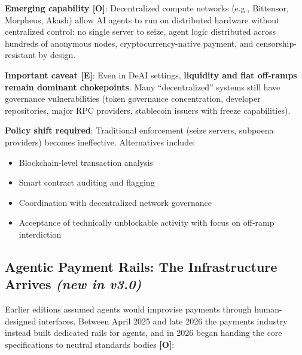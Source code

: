 \documentclass[11pt,letterpaper]{article}
\begin{document}
\textbf{Emerging capability [O]}: Decentralized compute networks (e.g., Bittensor, Morpheus, Akash) allow AI agents to run on distributed hardware without centralized control: no single server to seize, agent logic distributed across hundreds of anonymous nodes, cryptocurrency-native payment, and censorship-resistant by design.

\textbf{Important caveat [E]}: Even in DeAI settings, \textbf{liquidity and fiat off-ramps remain dominant chokepoints}. Many ``decentralized'' systems still have governance vulnerabilities (token governance concentration, developer repositories, major RPC providers, stablecoin issuers with freeze capabilities).

\textbf{Policy shift required}: Traditional enforcement (seize servers, subpoena providers) becomes ineffective. Alternatives include:
\begin{itemize}
  \item Blockchain-level transaction analysis
  \item Smart contract auditing and flagging
  \item Coordination with decentralized network governance
  \item Acceptance of technically unblockable activity with focus on off-ramp interdiction
\end{itemize}

\subsection{Agentic Payment Rails: The Infrastructure Arrives \textit{(new in v3.0)}}
\label{sec:rails}

Earlier editions assumed agents would improvise payments through human-designed interfaces. Between April 2025 and late 2026 the payments industry instead built dedicated rails for agents, and in 2026 began handing the core specifications to neutral standards bodies \textbf{[O]}:
\end{document}

